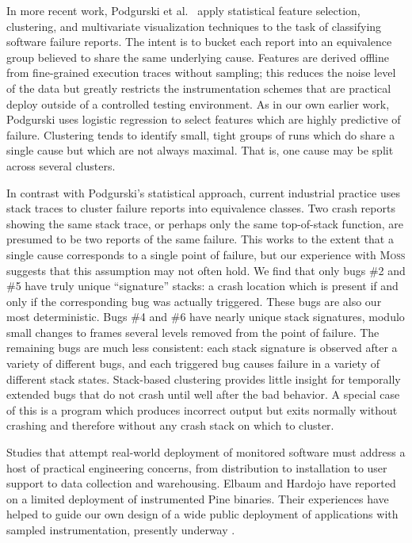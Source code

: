 \documentclass{sig-alternate}
\newcommand{\moss}{\textsc{Moss}\xspace}
\newcommand{\comment}[1]{}
\begin{document}
In more recent work, Podgurski et al.\ \cite{ICSE`03*465} apply
statistical feature selection, clustering, and multivariate
visualization techniques to the task of classifying software failure
reports.  The intent is to bucket each report into an equivalence
group believed to share the same underlying cause.  Features are
derived offline from fine-grained execution traces without sampling;
this reduces the noise level of the data but greatly restricts the
instrumentation schemes that are practical deploy outside of a
controlled testing environment.  As in our own earlier work, Podgurski
uses logistic regression to select features which are highly
predictive of failure.  \comment{Is it worth noting that we use
different strategies for limiting the size of the set of selected
features?  We use regularized logistic regression whereas Podgurski
applies standard logistic regression to randomly selected subsets of
the complete feature set and keeps the best-performing subset.}
Clustering tends to identify small, tight groups of runs which do
share a single cause but which are not always maximal.  That is, one
cause may be split across several clusters.

In contrast with Podgurski's statistical approach, current
industrial practice uses stack traces to cluster failure reports into
equivalence classes.  Two crash reports showing the same stack trace,
or perhaps only the same top-of-stack function, are presumed to be two
reports of the same failure.  This works to the extent that a single
cause corresponds to a single point of failure, but our experience
with \moss suggests that this assumption may not often hold.  We find
that only bugs \#2 and \#5 have truly unique ``signature'' stacks: a
crash location which is present if and only if the corresponding bug
was actually triggered.  These bugs are also our most deterministic.
Bugs \#4 and \#6 have nearly unique stack signatures, modulo small
changes to frames several levels removed from the point of failure.
The remaining bugs are much less consistent: each stack signature is
observed after a variety of different bugs, and each triggered bug
causes failure in a variety of different stack states.  Stack-based
clustering provides little insight for temporally extended bugs that
do not crash until well after the bad behavior.  A special case of
this is a program which produces incorrect output but exits normally
without crashing and therefore without any crash stack on which to
cluster.

Studies that attempt real-world deployment of monitored software must
address a host of practical engineering concerns, from distribution to
installation to user support to data collection and warehousing.
Elbaum and Hardojo \cite{Elbaum:2003:DISATA} have reported on a
limited deployment of instrumented Pine binaries.  Their experiences
have helped to guide our own design of a wide public deployment of
applications with sampled instrumentation, presently underway
\cite{Liblit:2003:CBIP}.
\end{document}

